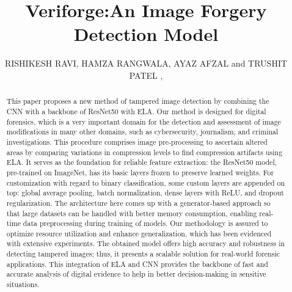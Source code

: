 \documentclass{ieeeaccess}
\begin{document}
\doi{}

\title{Veriforge:An Image Forgery Detection Model}
\author{\uppercase{Rishikesh Ravi},
\uppercase{Hamza Rangwala},
\uppercase{Ayaz Afzal} and \uppercase{Trushit Patel} ,
}

\address[1]{Wilfrid Laurier University, Waterloo ON Canada (email:rish8180@mylaurier.ca)}
\address[2]{Wilfrid Laurier University, Waterloo ON Canada (email:rang8720@mylaurier.ca)}
\address[3]{Wilfrid Laurier University, Waterloo ON Canada (email:afza9880@mylaurier.ca)}
\address[4]{Wilfrid Laurier University, Waterloo ON Canada (email:pate9410@mylaurier.ca)}





\begin{abstract}
This paper proposes a new method of tampered image detection by combining the CNN with a backbone of ResNet50 with ELA. Our method is designed for digital forensics, which is a very important domain for the detection and assessment of image modifications in many other domains, such as cybersecurity, journalism, and criminal investigations. This procedure comprises image pre-processing to ascertain altered areas by comparing variations in compression levels to find compression artifacts using ELA. It serves as the foundation for reliable feature extraction: the ResNet50 model, pre-trained on ImageNet, has its basic layers frozen to preserve learned weights.
For customization with regard to binary classification, some custom layers are appended on top: global average pooling, batch normalization, dense layers with ReLU, and dropout regularization. The architecture here comes up with a generator-based approach so that large datasets can be handled with better memory consumption, enabling real-time data preprocessing during training of models. Our methodology is assured to optimize resource utilization and enhance generalization, which has been evidenced with extensive experiments. The obtained model offers high accuracy and robustness in detecting tampered images; thus, it presents a scalable solution for real-world forensic applications. This integration of ELA and CNN provides the backbone of fast and accurate analysis of digital evidence to help in better decision-making in sensitive situations.
\end{abstract}
\end{document}

